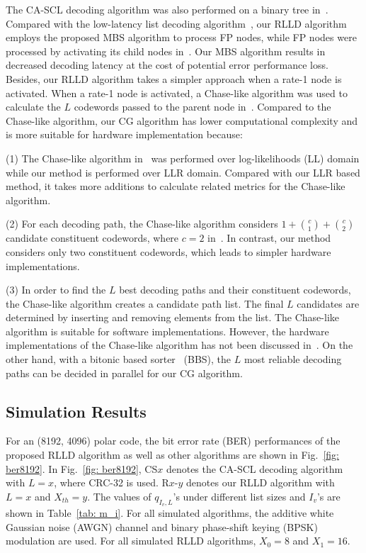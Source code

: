 \documentclass[journal]{IEEEtran}
\begin{document}
The CA-SCL decoding algorithm was also performed on a binary tree in~\cite{gabi_low_latency}. Compared with the low-latency list decoding algorithm~\cite{gabi_low_latency}, our RLLD algorithm employs the proposed MBS algorithm to process FP nodes, while FP nodes were processed by activating its child nodes in~\cite{gabi_low_latency}. Our MBS algorithm results in decreased decoding latency at the cost of potential error performance loss. Besides, our RLLD algorithm takes a simpler approach when a rate-1 node is activated.
When a rate-1 node is activated, a Chase-like algorithm was used to calculate the $L$ codewords passed to the parent node in~\cite{gabi_low_latency}. Compared to the Chase-like algorithm, our CG algorithm has lower computational complexity and is more suitable for hardware implementation because:

(1) The Chase-like algorithm in~\cite{gabi_low_latency} was performed over log-likelihoods (LL) domain while our method is performed over LLR domain. Compared with our LLR based method, it takes more additions to calculate related metrics for the Chase-like algorithm.

(2) For each decoding path, the Chase-like algorithm considers $1+{c \choose 1} + {c \choose 2}$ candidate constituent codewords, where $c=2$ in~\cite{gabi_low_latency}. In contrast, our method considers only two constituent codewords, which leads to simpler hardware implementations.

(3) In order to find the $L$ best decoding paths and their constituent codewords, the Chase-like algorithm creates a candidate path list. The final $L$ candidates are determined by inserting and removing elements from the list. The Chase-like algorithm is suitable for software implementations. However, the hardware implementations of the Chase-like algorithm has not been discussed in~\cite{gabi_low_latency}. On the other hand, with a bitonic based sorter~\cite{jun_low_mem_list} (BBS), the $L$ most reliable decoding paths can be decided in parallel for our CG algorithm.


\subsection{Simulation Results} \label{ssec: sim1}
For an (8192, 4096) polar code, the bit error rate (BER) performances of the proposed RLLD algorithm as well as other algorithms are shown in Fig.~\ref{fig: ber8192}. In Fig.~\ref{fig: ber8192}, CS$x$ denotes the CA-SCL decoding algorithm with $L=x$, where CRC-32 is used. R$x$-$y$ denotes our RLLD algorithm with $L=x$ and $X_{th}=y$. The values of $q_{I_v, L}$'s under different list sizes and $I_v$'s are shown in Table~\ref{tab: m_i}. For all simulated algorithms, the additive white Gaussian noise (AWGN) channel and binary phase-shift keying (BPSK) modulation are used. For all simulated RLLD algorithms, $X_0=8$ and $X_1=16$.
\end{document}

